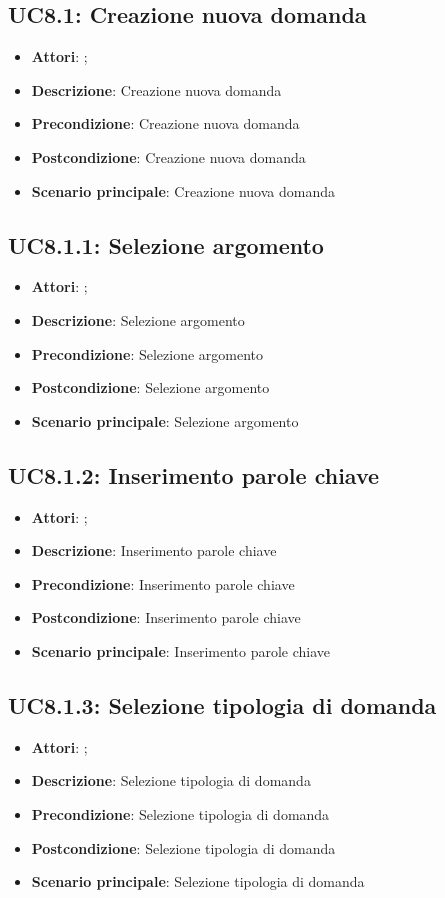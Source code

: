 \subsection{UC8.1: Creazione nuova domanda}
\label{UC8.1}
\begin{itemize}
\item \textbf{Attori}: ;
\item \textbf{Descrizione}: Creazione nuova domanda
\item \textbf{Precondizione}: Creazione nuova domanda
\item \textbf{Postcondizione}: Creazione nuova domanda
\item \textbf{Scenario principale}:
Creazione nuova domanda
\end{itemize}

\subsection{UC8.1.1: Selezione argomento}
\label{UC8.1.1}
\begin{itemize}
\item \textbf{Attori}: ;
\item \textbf{Descrizione}: Selezione argomento
\item \textbf{Precondizione}: Selezione argomento
\item \textbf{Postcondizione}: Selezione argomento
\item \textbf{Scenario principale}:
Selezione argomento
\end{itemize}

\subsection{UC8.1.2: Inserimento parole chiave}
\label{UC8.1.2}
\begin{itemize}
\item \textbf{Attori}: ;
\item \textbf{Descrizione}: Inserimento parole chiave
\item \textbf{Precondizione}: Inserimento parole chiave
\item \textbf{Postcondizione}: Inserimento parole chiave
\item \textbf{Scenario principale}:
Inserimento parole chiave
\end{itemize}

\subsection{UC8.1.3: Selezione tipologia di domanda}
\label{UC8.1.3}
\begin{itemize}
\item \textbf{Attori}: ;
\item \textbf{Descrizione}: Selezione tipologia di domanda
\item \textbf{Precondizione}: Selezione tipologia di domanda
\item \textbf{Postcondizione}: Selezione tipologia di domanda
\item \textbf{Scenario principale}:
Selezione tipologia di domanda
\end{itemize}

